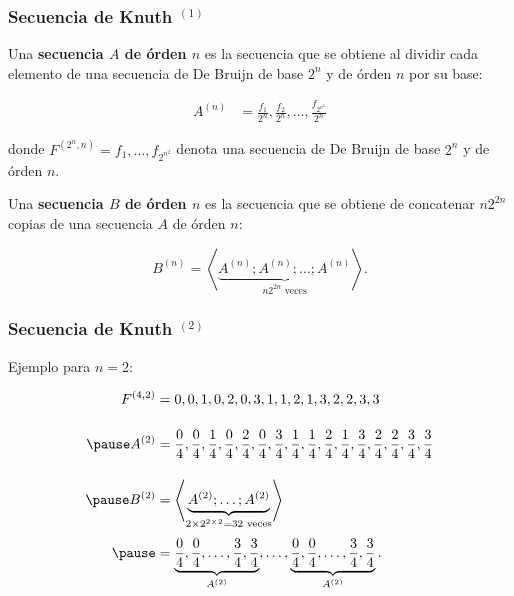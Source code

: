 \documentclass[t, 10pt, mathserif]{beamer}
\begin{document}

\begin{frame}
  \frametitle{Secuencia de Knuth {$^{(1)}$}}

  \vspace{-0.4cm}
  \begin{definition}
    Una \textbf{secuencia $A$ de órden $n$} es la secuencia que se obtiene al dividir cada elemento de una secuencia de De Bruijn de base $2^n$ y de órden $n$ por su base:
    \pause

    \vspace{-0.2cm}
    \begin{equation*}
      \begin{aligned}
        A^{(n)} & = \frac{f_1}{2^n}, \frac{f_2}{2^n}, \dots, \frac{f_{2^{n^2}}}{2^n}
      \end{aligned}
    \end{equation*}
    \pause

    \vspace{-0.2cm}
    donde $F^{(2^n, n)} = f_1, \dots, f_{2^{n^2}}$ denota una secuencia de De Bruijn de base $2^n$ y de órden $n$.
    \pause

    Una \textbf{secuencia $B$ de órden $n$} es la secuencia que se obtiene de concatenar $n 2^{2 n}$ copias de una secuencia $A$ de órden $n$:
    \pause

    \vspace{-0.2cm}
    \begin{equation*}
      B^{(n)} = \left< \underbrace{A^{(n)} ; A^{(n)} ; \dots ; A^{(n)}}_{n 2^{2 n} \text{ veces}} \right> \text{.}
    \end{equation*}
  \end{definition}
\end{frame}



\begin{frame}
  \frametitle{Secuencia de Knuth {$^{(2)}$}}

  Ejemplo para $n = 2$:
  \pause

  \begin{equation*}
    \begin{aligned}
      F^{(4, 2)} & = 0, 0, 1, 0, 2, 0, 3, 1, 1, 2, 1, 3, 2, 2, 3, 3 \\[0.4cm] \pause
      A^{(2)}    & = \frac{0}{4}, \frac{0}{4}, \frac{1}{4}, \frac{0}{4}, \frac{2}{4}, \frac{0}{4}, \frac{3}{4}, \frac{1}{4}, \frac{1}{4}, \frac{2}{4}, \frac{1}{4}, \frac{3}{4}, \frac{2}{4}, \frac{2}{4}, \frac{3}{4}, \frac{3}{4} \\[0.4cm] \pause
      B^{(2)}   & = \left< \underbrace{A^{(2)} ; \dots ; A^{(2)}}_{2 \times 2^{2 \times 2} = 32 \text{ veces}} \right> \\[0.1cm] \pause
                & = \underbrace{\frac{0}{4}, \frac{0}{4}, \dots, \frac{3}{4}, \frac{3}{4}}_{A^{(2)}}, \dots, \underbrace{\frac{0}{4}, \frac{0}{4}, \dots, \frac{3}{4}, \frac{3}{4}}_{A^{(2)}} \text{.}
    \end{aligned}
  \end{equation*}
\end{frame}
\end{document}
